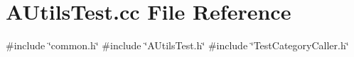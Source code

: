 \section{A\+Utils\+Test.\+cc File Reference}
\label{AUtilsTest_8cc}
{\ttfamily \#include \char`\"{}common.\+h\char`\"{}}\newline
{\ttfamily \#include \char`\"{}A\+Utils\+Test.\+h\char`\"{}}\newline
{\ttfamily \#include \char`\"{}Test\+Category\+Caller.\+h\char`\"{}}\newline
